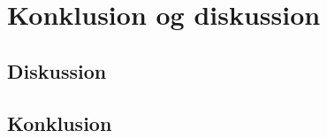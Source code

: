 \chapter{Konklusion og diskussion}
\label{cha:konkl-og-disk}

\section{Diskussion}
\label{sec:diskussion}


\section{Konklusion}
\label{sec:konklusion}


